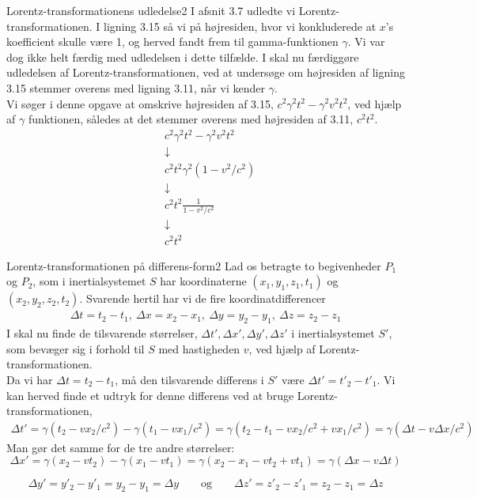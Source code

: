 \begin{opgave}{Lorentz-transformationens udledelse}{2}
	I afsnit 3.7 udledte vi Lorentz-transformationen. I ligning 3.15 så vi på højresiden, hvor vi konkluderede at $x$'s koefficient skulle være 1, og herved fandt frem til gamma-funktionen $\gamma$. Vi var dog ikke helt færdig med udledelsen i dette tilfælde.
	\opg I skal nu færdiggøre udledelsen af Lorentz-transformationen, ved at undersøge om højresiden af ligning 3.15 stemmer overens med ligning 3.11, når vi kender $\gamma$.\\
	
	Vi søger i denne opgave at omskrive højresiden af 3.15, $c^2\gamma^2t^2-\gamma^2v^2t^2$, ved hjælp af $\gamma$ funktionen, således at det stemmer overens med højresiden af 3.11, $c^2t^2$.
	\begin{align*}
		&c^2\gamma^2t^2-\gamma^2v^2t^2 \\
		&\downarrow \\
		&c^2t^2\gamma^2(1-v^2/c^2) \\
		&\downarrow \\
		&c^2t^2\frac{1}{1-v^2/c^2} \\
		&\downarrow \\
		&c^2t^2
	\end{align*}
\end{opgave}

\begin{opgave}{Lorentz-transformationen på differens-form}{2} \label{lorentz_diff2}
	Lad os betragte to begivenheder $P_1$ og $P_2$, som i inertialsystemet $S$ har koordinaterne $(x_1,y_1,z_1,t_1)$ og $(x_2,y_2,z_2,t_2)$. Svarende hertil har vi de fire koordinatdifferencer
	\begin{align}
		\Delta t=t_2-t_1, \	 \Delta x=x_2-x_1, \ \Delta y=y_2-y_1, \ \Delta z= z_2-z_1 \nonumber
	\end{align}
	\opg I skal nu finde de tilsvarende størrelser,
	\begin{math}
		\Delta t',  \Delta x',  \Delta y',  \Delta z'
	\end{math}
	i inertialsystemet $S'$, som bevæger sig i forhold til $S$ med hastigheden $v$, ved hjælp af Lorentz-transformationen.\\
	
	Da vi har $\Delta t=t_2-t_1$, må den tilsvarende differens i $S'$ være $\Delta t'=t'_2-t'_1$. Vi kan herved finde et udtryk for denne differens ved at bruge Lorentz-transformationen,
	\begin{align*}
		\Delta t'=\gamma(t_2-vx_2/c^2)-\gamma(t_1-vx_1/c^2)=\gamma(t_2-t_1-vx_2/c^2+vx_1/c^2)=\gamma(\Delta t-v\Delta x/c^2)
	\end{align*}
	Man gør det samme for de tre andre størrelser:
	$$\Delta x' = \gamma \left( x_2 - vt_2 \right) - \gamma \left( x_1 - vt_1 \right) = \gamma \left( x_2 - x_1 -vt_2 + vt_1 \right) = \gamma \left( \Delta x - v \Delta t \right)$$
	
	$$\Delta y' = y'_2 - y'_1 = y_2 - y_1 = \Delta y \quad \quad \text{og} \quad \quad \Delta z' = z'_2 - z'_1 = z_2 - z_1 = \Delta z$$
\end{opgave}


